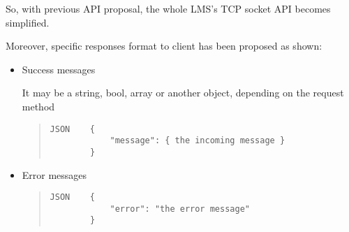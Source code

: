 So, with previous API proposal, the whole LMS's TCP socket API becomes simplified.

Moreover, specific responses format to client has been proposed as shown:

\begin{itemize}
\item Success messages \hfill

It may be a string, bool, array or another object, depending on the request method

\begin{quote}
\begin{verbatim}
JSON    {
            "message": { the incoming message }
        }
\end{verbatim}
\end{quote}        
\item Error messages \hfill

\begin{quote}
\begin{verbatim}
JSON    {
            "error": "the error message"
        }
\end{verbatim}
\end{quote}
\end{itemize}